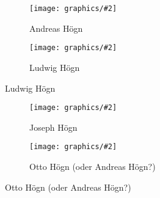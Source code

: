 \documentclass{book}
\newcommand{\img}[2][width=\linewidth]{\noindent\texttt{[image: graphics/\#2]}}
\begin{document}
\begin{figure}
\begin{subfigure}[b]{0.5\linewidth}
\img{Andreas-Hoegn}
\caption{Andreas Högn}
\end{subfigure}
\begin{subfigure}[b]{0.5\linewidth}
\img{Ludwig-Hoegn}
\caption{Ludwig Högn}
\end{subfigure}
\end{figure}

\begin{figure}
\begin{subfigure}[b]{0.5\linewidth}
\img{Joseph-Hoegn}
\caption{Joseph Högn}
\end{subfigure}
\begin{subfigure}[b]{0.5\linewidth}
\img{Otto-Hoegn}
\caption{Otto Högn (oder Andreas Högn?)}
\end{subfigure}	
\end{figure}
\end{document}
